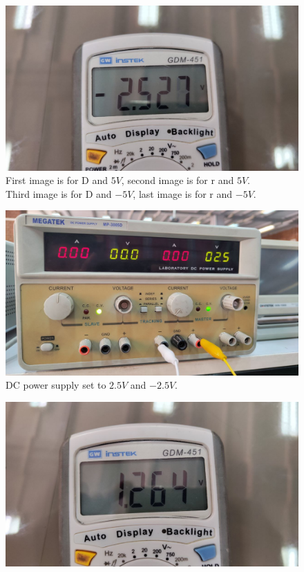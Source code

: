 \documentclass[11pt]{article}
\newcommand{\PicScale}{0.2}
\begin{document}
\begin{question}
\begin{subquestion}
{\begin{figure}[H]
                \includegraphics[scale=0.08,angle=0]{Fig/18.jpeg}
                \caption{First image is for D and $5V$, second image is for r and $5V$. \\
                \hspace*{14mm} Third image is for D and $-5V$, last image is for r and $-5V$.}
            \end{figure}
            \begin{figure}[H]
                \centering
                \includegraphics[scale=\PicScale,angle=0]{Fig/19.jpeg}
                \caption{DC power supply set to $2.5V$ and $-2.5V$.}
            \end{figure}
            \begin{figure}[H]
                \centering
                \includegraphics[scale=0.08,angle=0]{Fig/20.jpeg}

\end{figure}}
\end{subquestion}
\end{question}
\end{document}
